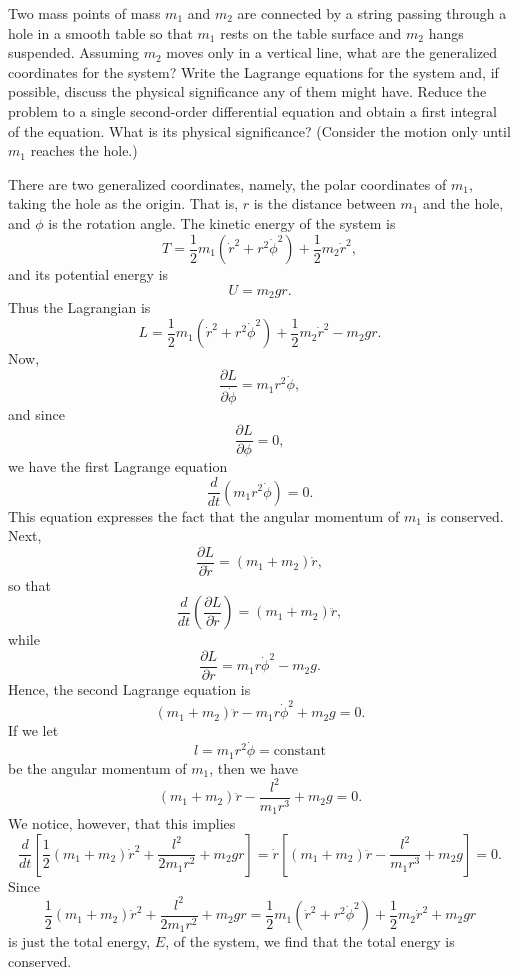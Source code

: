 \begin{questions}
\question
Two mass points of mass $m_1$ and $m_2$ are connected by a string passing through a hole in a smooth table so that $m_1$ rests on the table surface and $m_2$ hangs suspended. Assuming $m_2$ moves only in a vertical line, what are the generalized coordinates for the system? Write the Lagrange equations for the system and, if possible, discuss the physical significance any of them might have. Reduce the problem to a single second-order differential equation and obtain a first integral of the equation. What is its physical significance? (Consider the motion only until $m_1$ reaches the hole.)
\begin{solution}
There are two generalized coordinates, namely, the polar coordinates of $m_1$, taking the hole as the origin. That is, $r$ is the distance between $m_1$ and the hole, and $\phi$ is the rotation angle. The kinetic energy of the system is
\[
T = \frac{1}{2} m_1 ( \dot{r}^2 + r^2 \dot{\phi}^2 ) + \frac{1}{2} m_2 \dot{r}^2,
\]
and its potential energy is
\[
U = m_2 g r.
\]
Thus the Lagrangian is
\[
L = \frac{1}{2} m_1 ( \dot{r}^2 + r^2 \dot{\phi}^2 ) + \frac{1}{2} m_2 \dot{r}^2 - m_2 g r.
\]
Now,
\[
\frac{\partial L}{\partial \dot{\phi}} = m_1 r^2 \dot{\phi},
\]
and since
\[
\frac{\partial L}{\partial \phi} = 0,
\]
we have the first Lagrange equation
\[
\frac{d}{dt} \left( m_1 r^2 \dot{\phi} \right) = 0.
\]
This equation expresses the fact that the angular momentum of $m_1$ is conserved. Next,
\[
\frac{\partial L}{\partial \dot{r}} = \left( m_1 + m_2 \right) \dot{r},
\]
so that
\[
\frac{d}{dt} \left( \frac{\partial L}{\partial \dot{r}} \right) = \left( m_1 + m_2 \right) \ddot{r},
\]
while
\[
\frac{\partial L}{\partial r} = m_1 r \dot{\phi}^2 - m_2 g.
\]
Hence, the second Lagrange equation is
\[
\left( m_1 + m_2 \right) \ddot{r} - m_1 r \dot{\phi}^2 + m_2 g = 0.
\]
If we let
\[l = m_1 r^2 \dot{\phi} = \text{constant}
\]
be the angular momentum of $m_1$, then we have
\[
( m_1 + m_2 ) \ddot{r} - \frac{l^2}{m_1 r^3} + m_2 g = 0.
\]
We notice, however, that this implies
\[
\frac{d}{dt} \left[ \frac{1}{2} ( m_1 + m_2 ) \dot{r}^2 + \frac{l^2}{2 m_1 r^2} + m_2 g r \right] = \dot{r} \left[ ( m_1 + m_2 ) \ddot{r} - \frac{l^2}{m_1 r^3} + m_2 g \right] = 0.
\]
Since
\[
\frac{1}{2} ( m_1 + m_2 ) \dot{r}^2 + \frac{l^2}{2 m_1 r^2} + m_2 g r = \frac{1}{2} m_1 ( \dot{r}^2 + r^2 \dot{\phi}^2 ) + \frac{1}{2} m_2 \dot{r}^2 + m_2 g r
\]
is just the total energy, $E$, of the system, we find that the total energy is conserved.
\end{solution}


\end{questions}
